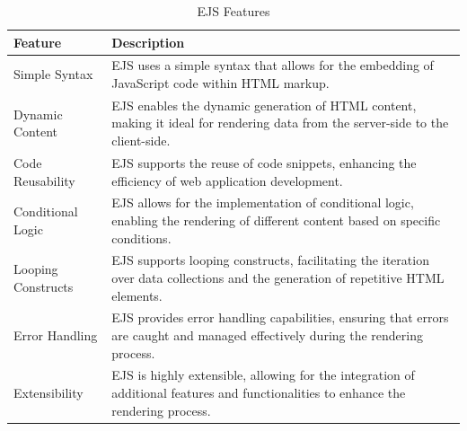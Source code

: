 \begin{table}[H]
    \centering
    \begin{tabularx}{\textwidth}{|l|X|}
        \hline
        \textbf{Feature}     & \textbf{Description}                                                                                                                              \\
        \hline
        Simple Syntax       & EJS uses a simple syntax that allows for the embedding of JavaScript code within HTML markup.                                                      \\
        \hline
        Dynamic Content     & EJS enables the dynamic generation of HTML content, making it ideal for rendering data from the server-side to the client-side.                      \\
        \hline
        Code Reusability    & EJS supports the reuse of code snippets, enhancing the efficiency of web application development.                                                    \\
        \hline
        Conditional Logic   & EJS allows for the implementation of conditional logic, enabling the rendering of different content based on specific conditions.                      \\
        \hline
        Looping Constructs  & EJS supports looping constructs, facilitating the iteration over data collections and the generation of repetitive HTML elements.                      \\
        \hline
        Error Handling      & EJS provides error handling capabilities, ensuring that errors are caught and managed effectively during the rendering process.                         \\
        \hline
        Extensibility       & EJS is highly extensible, allowing for the integration of additional features and functionalities to enhance the rendering process.                      \\
        \hline
    \end{tabularx}
    \label{tab:ejs}
    \caption{EJS Features}
\end{table}




